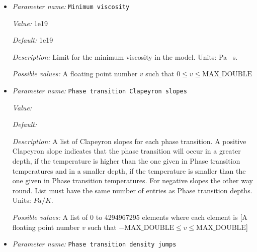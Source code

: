 \begin{itemize}
{\it Default:} 1e24


{\it Description:} Limit for the maximum viscosity in the model. Units: Pa \, s.


{\it Possible values:} A floating point number $v$ such that $0 \leq v \leq \text{MAX\_DOUBLE}$
\item {\it Parameter name:} {\tt Minimum viscosity}
\label{parameters:Material model/Latent heat/Minimum viscosity}
\label{parameters:Material_20model/Latent_20heat/Minimum_20viscosity}


{\it Value:} 1e19


{\it Default:} 1e19


{\it Description:} Limit for the minimum viscosity in the model. Units: Pa \, s.


{\it Possible values:} A floating point number $v$ such that $0 \leq v \leq \text{MAX\_DOUBLE}$
\item {\it Parameter name:} {\tt Phase transition Clapeyron slopes}
\label{parameters:Material model/Latent heat/Phase transition Clapeyron slopes}
\label{parameters:Material_20model/Latent_20heat/Phase_20transition_20Clapeyron_20slopes}


{\it Value:} 


{\it Default:} 


{\it Description:} A list of Clapeyron slopes for each phase transition. A positive Clapeyron slope indicates that the phase transition will occur in a greater depth, if the temperature is higher than the one given in Phase transition temperatures and in a smaller depth, if the temperature is smaller than the one given in Phase transition temperatures. For negative slopes the other way round. List must have the same number of entries as Phase transition depths. Units: $Pa/K$.


{\it Possible values:} A list of 0 to 4294967295 elements where each element is [A floating point number $v$ such that $-\text{MAX\_DOUBLE} \leq v \leq \text{MAX\_DOUBLE}$]
\item {\it Parameter name:} {\tt Phase transition density jumps}
\label{parameters:Material model/Latent heat/Phase transition density jumps}
\label{parameters:Material_20model/Latent_20heat/Phase_20transition_20density_20jumps}



\end{itemize}

